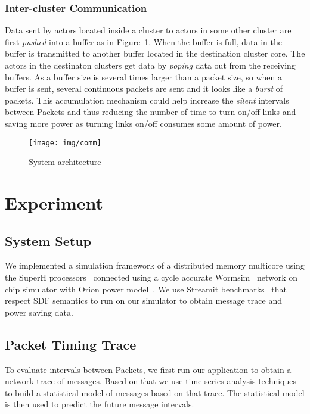 \documentclass[12pt]{article}
\begin{document}
\subsubsection{Inter-cluster Communication}\label{sec:cluster_comm}
Data sent by actors located inside a cluster to actors in some other
cluster are first \textit{pushed} into a buffer as in Figure~\ref{fig:comm}. When the buffer
is full, data in the buffer is transmitted to another buffer located in the
destination cluster core. The actors in the destinaton clusters get data by
\textit{poping} data out from the receiving buffers. As a buffer size is
several times larger than a packet size, so when a buffer is sent, several
continuous packets are sent and it looks like a \textit{burst} of packets. This
accumulation mechanism could help increase the \textit{silent} intervals between
Packets and thus reducing the number of time to turn-on/off links and saving
more power as turning links on/off consumes some amount of power.


\begin{figure}[ht!]
\centering
\texttt{[image: img/comm]}
\caption{System architecture}\label{fig:comm}
\end{figure}

\section{Experiment}
\subsection{System Setup}
We implemented a simulation framework of a distributed memory multicore using
the SuperH processors~\cite{Stanley-MarbellSunflower} connected using a
cycle accurate Wormsim~\cite{Wormsim} network on chip simulator with Orion power
model~\cite{WangOrion}. We use Streamit benchmarks~\cite{ThiesStreamIt} that
respect SDF semantics to run on our simulator to obtain message trace and power
saving data.

\subsection{Packet Timing Trace}
To evaluate intervals between Packets, we first run our application to obtain a
network trace of messages. Based on that we use time series analysis
techniques~\cite{BrillingerTimeSeries, ShumwayTimeSeries} to build a statistical
model of messages based on that trace. The statistical model is then used to
predict the future message intervals.
\end{document}
